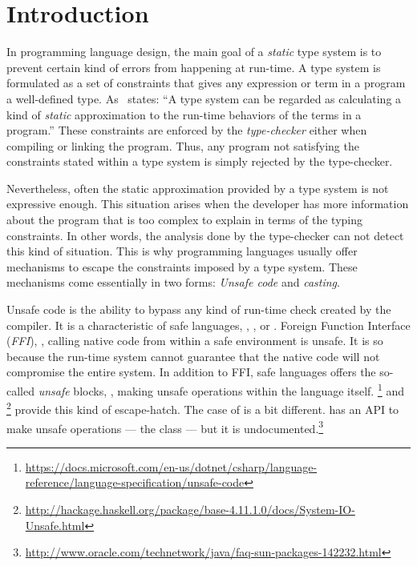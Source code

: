 
\chapter{Introduction}


In programming language design, the main goal of a \emph{static} type system is to prevent certain kind of errors from happening at run-time.
A type system is formulated as a set of constraints that gives any expression or term in a program a well-defined type.
As~\cite{pierceTypesProgrammingLanguages2002} states: ``A type system can be regarded as calculating a kind of \emph{static} approximation to the run-time behaviors of the terms in a program.''
These constraints are enforced by the \emph{type-checker} either when compiling or linking the program.
Thus, any program not satisfying the constraints stated within a type system is simply rejected by the type-checker.

Nevertheless, often the static approximation provided by a type system is not expressive enough.
This situation arises when the developer has more information about the program that is too complex to explain in terms of the typing constraints.
In other words, the analysis done by the type-checker can not detect this kind of situation.
This is why programming languages usually offer mechanisms to escape the constraints imposed by a type system.
These mechanisms come essentially in two forms: \emph{Unsafe code} and \emph{casting}.

Unsafe code is the ability to bypass any kind of run-time check created by the compiler.
It is a characteristic of safe languages, \eg{}, ,  or .
Foreign Function Interface (\emph{FFI}), \ie{}, calling native code from within a safe environment is unsafe.
It is so because the run-time system cannot guarantee that the native code will not compromise the entire system.
In addition to FFI, safe languages offers the so-called \emph{unsafe} blocks, \ie{}, making unsafe operations within the language itself.
\footnote{\url{https://docs.microsoft.com/en-us/dotnet/csharp/language-reference/language-specification/unsafe-code}}
and \footnote{\url{http://hackage.haskell.org/package/base-4.11.1.0/docs/System-IO-Unsafe.html}}
provide this kind of escape-hatch.
The case of  is a bit different.
 has an API to make unsafe operations --- the  class --- 
but it is undocumented.\footnote{\url{http://www.oracle.com/technetwork/java/faq-sun-packages-142232.html}}

